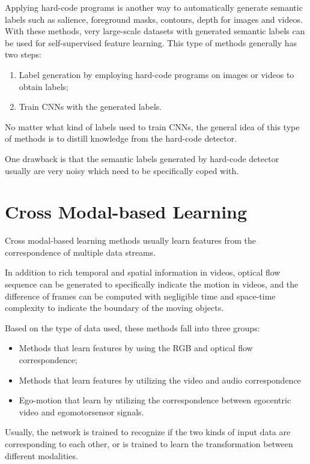 Applying hard-code programs is another way to automatically generate semantic
labels such as salience, foreground masks, contours, depth for images and videos.
With these methods, very large-scale datasets with generated semantic labels can
be used for self-supervised feature learning. This type of methods generally has
two steps:
\begin{enumerate}
      \item Label generation by employing hard-code programs on images or videos
            to obtain labels;
      \item Train CNNs with the generated labels.
\end{enumerate}

No matter what kind of labels used to train CNNs, the general idea of this type
of methods is to distill knowledge from the hard-code detector.

One drawback is that the semantic labels generated by hard-code detector usually
are very noisy which need to be specifically coped with.
\section{Cross Modal-based Learning}
Cross modal-based learning methods usually learn features from the correspondence
of multiple data streams.

In addition to rich temporal and spatial information in videos, optical flow
sequence can be generated to specifically indicate the motion in videos, and the
difference of frames can be computed with negligible time and space-time complexity
to indicate the boundary of the moving objects.

Based on the type of data used, these methods fall into three groups:
\begin{itemize}
      \item Methods that learn features by using the RGB and optical flow
            correspondence;
      \item Methods that learn features by utilizing the video and audio correspondence
      \item Ego-motion that learn by utilizing the correspondence between egocentric
            video and egomotorsensor signals.
\end{itemize}

Usually, the network is trained to recognize if the two kinds of input data are 
corresponding to each other, or is trained to learn the transformation between 
different modalities.